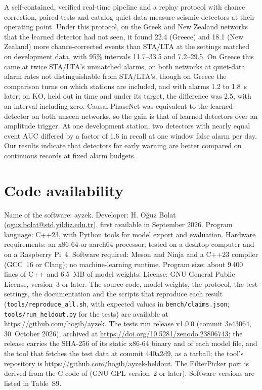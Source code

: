 \documentclass[a4paper,fleqn]{cas-sc}
\newcommand{\stalta}{STA/LTA}
\begin{document}
A self-contained, verified real-time pipeline and a replay protocol with chance
correction, paired tests and catalog-quiet data measure seismic detectors at their operating
point. Under this protocol, on the Greek and New Zealand networks that the learned
detector had not seen, it found 22.4 (Greece) and 18.1 (New Zealand) more
chance-corrected events than \stalta{} at the settings matched on development data,
with 95\% intervals 11.7--33.5 and 7.2--29.5. On Greece this came at twice
\stalta{}'s unmatched alarms, on both networks at quiet-data alarm rates not
distinguishable from \stalta{}'s, though on Greece the comparison turns on which
stations are included, and with alarms 1.2 to 1.8~s later; on KO, held out in
time and under its target, the difference was 2.5, with an interval including zero.
Causal PhaseNet was equivalent to the learned detector on both unseen networks, so the
gain is that of learned detectors over an amplitude trigger. At one development
station, two detectors with nearly equal event AUC differed by a factor of 1.6 in
recall at one window false alarm per day. Our results indicate that detectors for early warning
are better compared on continuous records at fixed alarm budgets.

\printcredits

\section*{Code availability}

Name of the software: ayzek. Developer: H. O\u{g}uz Bolat
(\href{mailto:oguz.bolat@std.yildiz.edu.tr}{oguz.bolat@std.yildiz.edu.tr}), first
available in September 2026. Program language: C++23, with Python tools for model export and
evaluation. Hardware requirements: an x86-64 or aarch64 processor; tested on a desktop
computer and on a Raspberry Pi~4. Software required: Meson and Ninja and a C++23
compiler (GCC~16 or Clang); no machine-learning runtime. Program size: about 9\,400
lines of C++ and 6.5~MB of model weights. License: GNU General Public License,
version~3 or later. The source code, model weights, the protocol, the test settings,
the documentation and the scripts that reproduce each result
(\texttt{tools/reproduce\_all.sh}, with expected values in \texttt{bench/claims.json};
\texttt{tools/run\_heldout.py} for the tests) are available at
\url{https://github.com/hogib/ayzek}. The tests run release v1.0.0
(commit 3e43064, 30~October 2026), archived at
\url{https://doi.org/10.5281/zenodo.23806743}; the release carries the SHA-256 of its
static x86-64 binary and of each model file, and the tool that fetches the test data
at commit 440a2d9, as a tarball; the tool's repository is
\url{https://github.com/hogib/ayzek-heldout}. The FilterPicker port is
derived from the C code of \citet{lomax2012} (GNU GPL version~2 or later). Software
versions are listed in Table~S9.
\end{document}
